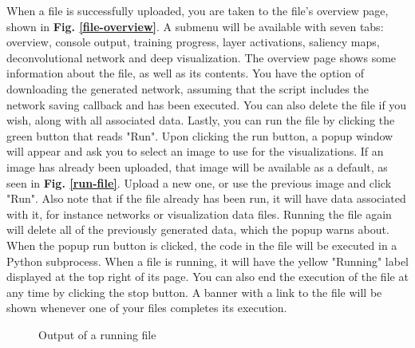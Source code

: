 \noindent When a file is successfully uploaded, you are taken to the file's overview page, shown in \textbf{Fig. \ref{file-overview}}. A submenu will be available with seven tabs: overview, console output, training progress, layer activations, saliency maps, deconvolutional network and deep visualization. The overview page shows some information about the file, as well as its contents. You have the option of downloading the generated network, assuming that the script includes the network saving callback and has been executed. You can also delete the file if you wish, along with all associated data. Lastly, you can run the file by clicking the green button that reads "Run". Upon clicking the run button, a popup window will appear and ask you to select an image to use for the visualizations. If an image has already been uploaded, that image will be available as a default, as seen in \textbf{Fig. \ref{run-file}}. Upload a new one, or use the previous image and click "Run". Also note that if the file already has been run, it will have data associated with it, for instance networks or visualization data files. Running the file again will delete all of the previously generated data, which the popup warns about. When the popup run button is clicked, the code in the file will be executed in a Python subprocess. When a file is running, it will have the yellow "Running" label displayed at the top right of its page. You can also end the execution of the file at any time by clicking the stop button. A banner with a link to the file will be shown whenever one of your files completes its execution.\\


\begin{figure}[h!]
    \centering
        \caption{Output of a running file}
        \label{output-tab}
\end{figure}

